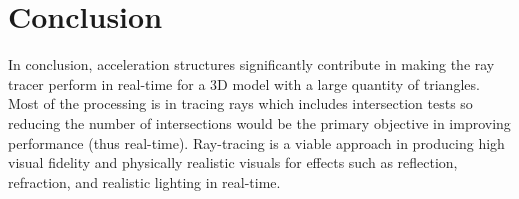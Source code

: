 \documentclass[final]{cmpreport}
\begin{document}
\section{Conclusion}

In conclusion, acceleration structures significantly contribute in making the ray tracer perform in real-time for a 3D model with a large quantity of triangles. Most of the processing is in tracing rays which includes intersection tests so reducing the number of intersections would be the primary objective in improving performance (thus real-time). Ray-tracing is a viable approach in producing high visual fidelity and physically realistic visuals for effects such as reflection, refraction, and realistic lighting in real-time.

\newpage

\end{document}

